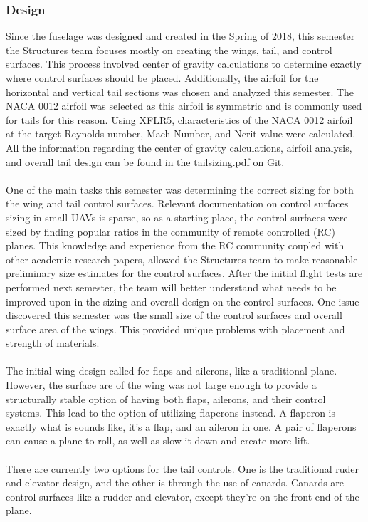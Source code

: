 \documentclass{article}
\begin{document}
\subsubsection{Design}
Since the fuselage was designed and created in the Spring of 2018, this semester the Structures team focuses mostly on creating the wings, tail, and control surfaces. This process involved center of gravity calculations to determine exactly where control surfaces should be placed. Additionally, the airfoil for the horizontal and vertical tail sections was chosen and analyzed this semester. The NACA 0012 airfoil was selected as this airfoil is symmetric and is commonly used for tails for this reason. Using XFLR5, characteristics of the NACA 0012 airfoil at the target Reynolds number, Mach Number, and Ncrit value were calculated. All the information regarding the center of gravity calculations, airfoil analysis, and overall tail design can be found in the tailsizing.pdf on Git. 
\\
\\One of the main tasks this semester was determining the correct sizing for both the wing and tail control surfaces. Relevant documentation on control surfaces sizing in small UAVs is sparse, so as a starting place, the control surfaces were sized by finding popular ratios in the community of remote controlled (RC) planes. This knowledge and experience from the RC community coupled with other academic research papers, allowed the Structures team to make reasonable preliminary size estimates for the control surfaces. After the initial flight tests are performed next semester, the team will better understand what needs to be improved upon in the sizing and overall design on the control surfaces. One issue discovered this semester was the small size of the control surfaces and overall surface area of the wings. This provided unique problems with placement and strength of materials.
\\
\\The initial wing design called for flaps and ailerons, like a traditional plane. However, the surface are of the wing was not large enough to provide a structurally stable option of having both flaps, ailerons, and their control systems. This lead to the option of utilizing flaperons instead. A flaperon is exactly what is sounds like, it's a flap, and an aileron in one. A pair of flaperons can cause a plane to roll, as well as slow it down and create more lift.
\\
\\There are currently two options for the tail controls. One is the traditional ruder and elevator design, and the other is through the use of canards. Canards are control surfaces like a rudder and elevator, except they're on the front end of the plane.
\end{document}
